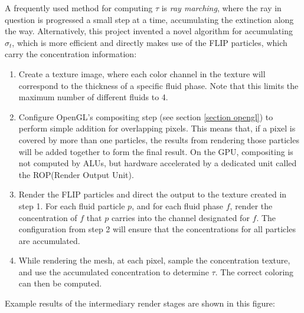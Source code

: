 A frequently used method for computing $\tau$ is \textit{ray marching}, where the ray in question is progressed a small step at a time, accumulating the extinction along the way. Alternatively, this project invented a novel algorithm for accumulating $\sigma_t$, which is more efficient and directly makes use of the FLIP particles, which carry the concentration information:
\begin{enumerate}
    \item 
    Create a texture image, where each color channel in the texture will correspond to the thickness of a specific fluid phase. Note that this limits the maximum number of different fluids to 4.

    \item 
    Configure OpenGL's compositing step (see section \ref{section opengl}) to perform simple addition for overlapping pixels. This means that, if a pixel is covered by more than one particles, the results from rendering those particles will be added together to form the final result. On the GPU, compositing is not computed by ALUs, but hardware accelerated by a dedicated unit called the ROP(Render Output Unit).

    \item 
    Render the FLIP particles and direct the output to the texture created in step 1. For each fluid particle $p$, and for each fluid phase $f$, render the concentration of $f$ that $p$ carries into the channel designated for $f$. The configuration from step 2 will ensure that the concentrations for all particles are accumulated.

    \item 
    While rendering the mesh, at each pixel, sample the concentration texture, and use the accumulated concentration to determine $\tau$. The correct coloring can then be computed.
    
\end{enumerate}
Example results of the intermediary render stages are shown in this figure:
\newpage

    
\addtolength{\topmargin}{-.875in}

